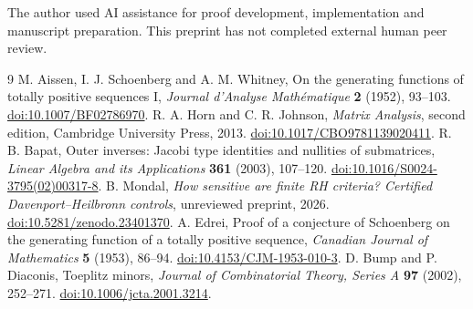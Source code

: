\documentclass[11pt]{amsart}
\begin{document}
The author used AI assistance for proof development, implementation and manuscript
preparation. This preprint has not completed external human peer review.

\begin{thebibliography}{9}
M. Aissen, I. J. Schoenberg and A. M. Whitney,
On the generating functions of totally positive sequences I,
\emph{Journal d'Analyse Math\'ematique} \textbf{2} (1952), 93--103.
\href{https://doi.org/10.1007/BF02786970}{doi:10.1007/BF02786970}.
R. A. Horn and C. R. Johnson, \emph{Matrix Analysis}, second edition,
Cambridge University Press, 2013.
\href{https://doi.org/10.1017/CBO9781139020411}{doi:10.1017/CBO9781139020411}.
R. B. Bapat, Outer inverses: Jacobi type identities and nullities of submatrices,
\emph{Linear Algebra and its Applications} \textbf{361} (2003), 107--120.
\href{https://doi.org/10.1016/S0024-3795(02)00317-8}{doi:10.1016/S0024-3795(02)00317-8}.
B. Mondal, \emph{How sensitive are finite RH criteria? Certified Davenport--Heilbronn controls},
unreviewed preprint, 2026.
\href{https://doi.org/10.5281/zenodo.23401370}{doi:10.5281/zenodo.23401370}.
A. Edrei, Proof of a conjecture of Schoenberg on the generating function of a totally positive sequence, \emph{Canadian Journal of Mathematics} \textbf{5} (1953), 86--94.
\href{https://doi.org/10.4153/CJM-1953-010-3}{doi:10.4153/CJM-1953-010-3}.
D. Bump and P. Diaconis, Toeplitz minors, \emph{Journal of Combinatorial Theory, Series A} \textbf{97} (2002), 252--271.
\href{https://doi.org/10.1006/jcta.2001.3214}{doi:10.1006/jcta.2001.3214}.
\end{thebibliography}
\end{document}
